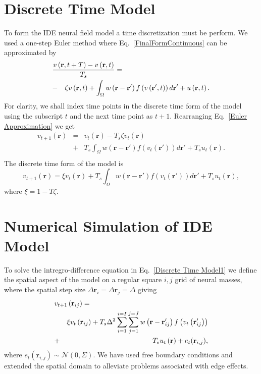 \documentclass[12pt]{iopart}
\begin{document}
\section{Discrete Time Model}\label{Time Discretization} To form the IDE neural field model a time discretization must be perform. We used a one-step Euler method where Eq.~\ref{FinalFormContinuous} can be approximated by 
\begin{eqnarray}
	\label{Euler Approximation} \lefteqn{\frac{v\left( \mathbf{r},t+T \right) - v\left( \mathbf{r},t\right)}{T_s} =}\nonumber\\
& -&\zeta v\left( \mathbf{r},t \right) + \int_\Omega {w\left( \mathbf{r}-\mathbf{r}' \right)f\left( {v\left( \mathbf{r}',t \right)} \right)d\mathbf{r}'} + u\left(\mathbf{r},t\right).\nonumber \\ 
\end{eqnarray}
For clarity, we shall index time points in the discrete time form of the model using the subscript $t$ and the next time point as $t+1$. Rearranging Eq.~\ref{Euler Approximation} we get 
\begin{eqnarray}
	\label{Euler Approximation2} v_{t+1}\left( \mathbf{r}\right) &=& v_t\left( \mathbf{r}\right) -T_s \zeta v_t\left( \mathbf{r}\right)\nonumber \\
&+& T_s \int_\Omega {w\left( \mathbf{r}-\mathbf{r}' \right)f\left( {v_t\left( \mathbf{r}'\right)} \right)d\mathbf{r}'} + T_s u_t\left(\mathbf{r}\right).\nonumber \\ 
\end{eqnarray}
The discrete time form of the model is 
\begin{equation}
	\label{Discrete Time Model1} v_{t+1}\left(\mathbf{r}\right) = \xi v_t\left(\mathbf{r}\right) + T_s \int_\Omega { w\left(\mathbf{r}-\mathbf{r}'\right) f\left(v_t\left(\mathbf{r}'\right)\right) d\mathbf{r}'} + T_s u_t\left(\mathbf{r}\right), 
\end{equation}
where $\xi = 1 - T \zeta$. 
\section{Numerical Simulation of IDE Model}\label{Space Discretization} To solve the intregro-difference equation in Eq.~\ref{Discrete Time Model1} we define the spatial aspect of the model on a regular square $i,j$ grid of neural masses, where the spatial step size $\Delta \mathbf{r}_i = \Delta \mathbf{r}_j = \Delta $ giving 
\begin{eqnarray}
	\label{discrete space} \lefteqn{v_{t+1}\left(\mathbf{r}_{ij}\right)=}\nonumber\\
&&\xi v_t\left(\mathbf{r}_{ij}\right)+T_s \Delta^2\sum_{i=1}^{i=I}{\sum_{j=1}^{j=J}{w\left(\mathbf{r}-\mathbf{r}_{ij}'\right)f\left( v_t\left( \mathbf{r}_{ij}'\right)\right)}}\nonumber\\
&+& T_s u_t\left(\mathbf{r}\right) + e_t(\mathbf{r}_{i,j}), 
\end{eqnarray}
where $e_t(\mathbf{r}_{i,j}) \sim \mathcal{N}\left(0,\Sigma\right)$. We have used free boundary conditions and extended the spatial domain to alleviate problems associated with edge effects. 
\end{document}
